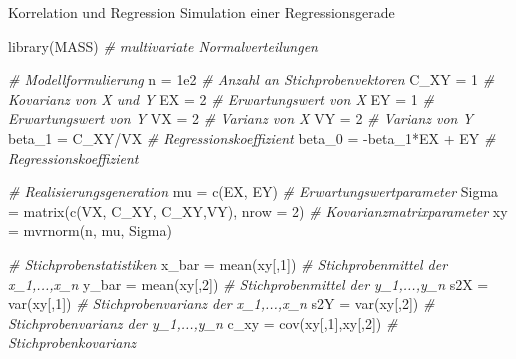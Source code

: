 \documentclass[
  8pt,
  ignorenonframetext,
]{beamer}
\newenvironment{Shaded}{\begin{snugshade}}{\end{snugshade}}
\newcommand{\AttributeTok}[1]{\textcolor[rgb]{0.77,0.63,0.00}{#1}}
\newcommand{\CommentTok}[1]{\textcolor[rgb]{0.56,0.35,0.01}{\textit{#1}}}
\newcommand{\DecValTok}[1]{\textcolor[rgb]{0.00,0.00,0.81}{#1}}
\newcommand{\FloatTok}[1]{\textcolor[rgb]{0.00,0.00,0.81}{#1}}
\newcommand{\FunctionTok}[1]{\textcolor[rgb]{0.00,0.00,0.00}{#1}}
\newcommand{\NormalTok}[1]{#1}
\newcommand{\OtherTok}[1]{\textcolor[rgb]{0.56,0.35,0.01}{#1}}
\newcommand{\SpecialCharTok}[1]{\textcolor[rgb]{0.00,0.00,0.00}{#1}}
\begin{document}
\begin{frame}[fragile]{Korrelation und Regression}
\protect\hypertarget{korrelation-und-regression-6}{}
Simulation einer Regressionsgerade

\tiny
{}

\begin{Shaded}
\begin{Highlighting}[]
\FunctionTok{library}\NormalTok{(MASS)                                   }\CommentTok{\# multivariate Normalverteilungen}

\CommentTok{\# Modellformulierung}
\NormalTok{n      }\OtherTok{=} \FloatTok{1e2}                                     \CommentTok{\# Anzahl an Stichprobenvektoren}
\NormalTok{C\_XY   }\OtherTok{=} \DecValTok{1}                                      \CommentTok{\# Kovarianz von X und Y}
\NormalTok{EX     }\OtherTok{=} \DecValTok{2}                                      \CommentTok{\# Erwartungswert von X}
\NormalTok{EY     }\OtherTok{=} \DecValTok{1}                                      \CommentTok{\# Erwartungswert von Y}
\NormalTok{VX     }\OtherTok{=} \DecValTok{2}                                      \CommentTok{\# Varianz von X}
\NormalTok{VY     }\OtherTok{=} \DecValTok{2}                                      \CommentTok{\# Varianz von Y}
\NormalTok{beta\_1 }\OtherTok{=}\NormalTok{ C\_XY}\SpecialCharTok{/}\NormalTok{VX                                }\CommentTok{\# Regressionskoeffizient}
\NormalTok{beta\_0 }\OtherTok{=} \SpecialCharTok{{-}}\NormalTok{beta\_1}\SpecialCharTok{*}\NormalTok{EX }\SpecialCharTok{+}\NormalTok{ EY                        }\CommentTok{\# Regressionskoeffizient}

\CommentTok{\# Realisierungsgeneration}
\NormalTok{mu     }\OtherTok{=} \FunctionTok{c}\NormalTok{(EX, EY)                              }\CommentTok{\# Erwartungswertparameter}
\NormalTok{Sigma  }\OtherTok{=} \FunctionTok{matrix}\NormalTok{(}\FunctionTok{c}\NormalTok{(VX, C\_XY, C\_XY,VY), }\AttributeTok{nrow =} \DecValTok{2}\NormalTok{) }\CommentTok{\# Kovarianzmatrixparameter}
\NormalTok{xy     }\OtherTok{=} \FunctionTok{mvrnorm}\NormalTok{(n, mu, Sigma)}

\CommentTok{\# Stichprobenstatistiken}
\NormalTok{x\_bar  }\OtherTok{=} \FunctionTok{mean}\NormalTok{(xy[,}\DecValTok{1}\NormalTok{])                           }\CommentTok{\# Stichprobenmittel  der x\_1,...,x\_n}
\NormalTok{y\_bar  }\OtherTok{=} \FunctionTok{mean}\NormalTok{(xy[,}\DecValTok{2}\NormalTok{])                           }\CommentTok{\# Stichprobenmittel  der y\_1,...,y\_n}
\NormalTok{s2X    }\OtherTok{=} \FunctionTok{var}\NormalTok{(xy[,}\DecValTok{1}\NormalTok{])                            }\CommentTok{\# Stichprobenvarianz der x\_1,...,x\_n}
\NormalTok{s2Y    }\OtherTok{=} \FunctionTok{var}\NormalTok{(xy[,}\DecValTok{2}\NormalTok{])                            }\CommentTok{\# Stichprobenvarianz der y\_1,...,y\_n}
\NormalTok{c\_xy   }\OtherTok{=} \FunctionTok{cov}\NormalTok{(xy[,}\DecValTok{1}\NormalTok{],xy[,}\DecValTok{2}\NormalTok{])                     }\CommentTok{\# Stichprobenkovarianz}


\end{Highlighting}
\end{Shaded}
\end{frame}
\end{document}
